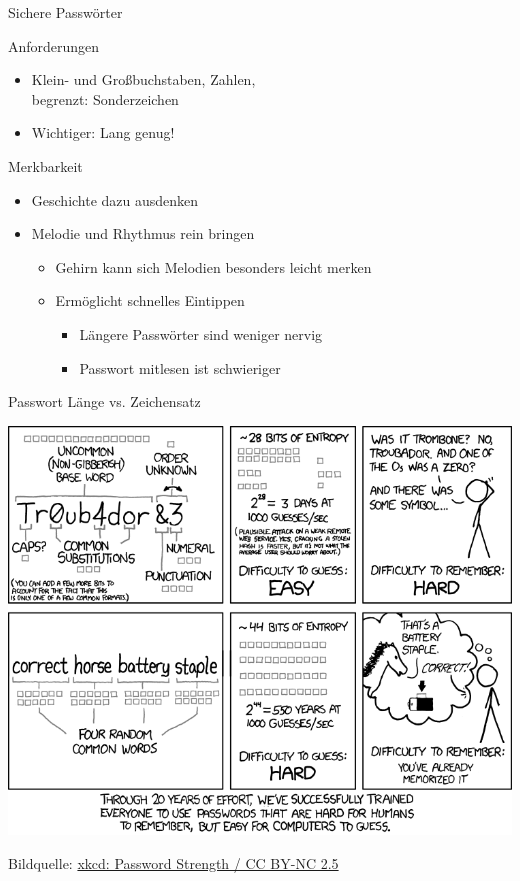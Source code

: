   \begin{frame}{Sichere Passwörter}
    \begin{block}{Anforderungen}
    \begin{itemize}
      \item Klein- und Großbuchstaben, Zahlen,\\ begrenzt: Sonderzeichen
      \item Wichtiger: Lang genug!
    \end{itemize}
    \end{block}
    \begin{block}{Merkbarkeit}
    \begin{itemize}
      \item Geschichte dazu ausdenken
      \item Melodie und Rhythmus rein bringen
      \begin{itemize}
        \item Gehirn kann sich Melodien besonders leicht merken
        \item Ermöglicht schnelles Eintippen
        \begin{itemize}
          \item Längere Passwörter sind weniger nervig
          \item Passwort mitlesen ist schwieriger
        \end{itemize}
      \end{itemize}
    \end{itemize}
    \end{block}
  \end{frame}

  \begin{frame}{Passwort Länge vs. Zeichensatz}
    \begin{center}
      \includegraphics[width=0.99\textheight]{images/password_strength.png}\\
    \end{center}
    \tiny Bildquelle: \href{http://xkcd.com/936/}{xkcd: Password Strength / CC BY-NC 2.5}
  \end{frame}

